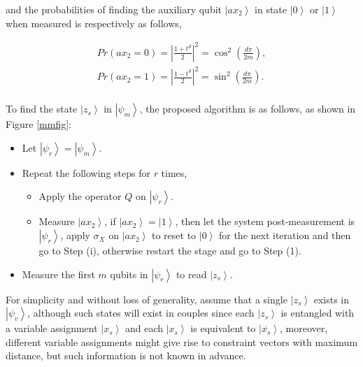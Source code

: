 \documentclass[a4paper]{article}
\begin{document}
\noindent
and the probabilities of finding the auxiliary qubit $\left|ax_2 \right\rangle$ in state 
${\left| 0 \right\rangle }$ or ${\left| 1 \right\rangle }$ when measured is respectively as follows,

\begin{equation}
\begin{array}{l}
 Pr{(ax_2  = 0)}  = \left| {\frac{{1 + t^d }}{2}} \right|^2  = \cos ^2 \left( {\frac{{d\pi }}{{2m}}} \right), \\ 
 Pr{(ax_2  = 1)}  = \left| {\frac{{1 - t^d }}{2}} \right|^2  = \sin ^2 \left( {\frac{{d\pi }}{{2m}}} \right). \\ 
 \end{array}
\end{equation}




To find the state ${\left| z_s \right\rangle }$ in $\left| {\psi _m } \right\rangle$, 
the proposed algorithm is as follows, as shown in Figure \ref{mmfig}:

\begin{itemize}
\item[1-] Let $\left| {\psi _r } \right\rangle = \left| {\psi _m } \right\rangle$.
\item[2-]  Repeat the following steps for $r$ times,
\begin{itemize}
\item[i-] Apply the operator $Q$ on $\left| {\psi _r } \right\rangle$.
\item[ii-] Measure $\left| ax_2 \right\rangle$, 
if $\left|ax_2 \right\rangle=\left|1 \right\rangle$, 
then let the system post-measurement is $\left| {\psi _r } \right\rangle$, apply $\sigma_X$ on $\left| ax_2 \right\rangle$ 
to reset to $\left| 0 \right\rangle$ for the next iteration and then go to Step (i), otherwise restart the stage and go to Step (1).
\end{itemize}
\item[3-] Measure the first $m$ qubits in $\left| {\psi _r } \right\rangle$ to read $\left| z_s \right\rangle$.
\end{itemize}


For simplicity and without loss of generality, assume that a single $\left| z_s \right\rangle$ exists in $\left| \psi_v \right\rangle$, although such states 
will exist in couples since each $\left| z_s \right\rangle$ is entangled with a variable assignment 
$\left| x_s \right\rangle$ and each $\left| x_s \right\rangle$ is equivalent to 
$\left| \overline {x_s} \right\rangle$, moreover, different variable assignments might give rise to 
constraint vectors with maximum distance, but such information is not known in advance.
\end{document}
